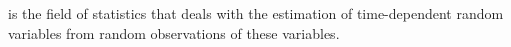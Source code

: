  is the field of statistics that deals with the estimation of time-dependent random variables from random observations of these variables.